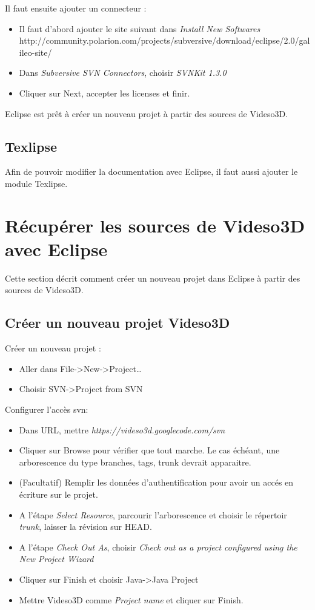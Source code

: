 \documentclass[a4paper, titlepage]{article}
\begin{document}
\vspace{\baselineskip}

Il faut ensuite ajouter un connecteur :
\begin{itemize}
  \item Il faut d'abord ajouter le site suivant dans \emph{Install New
  Softwares} http://community.polarion.com/projects/subversive/download/eclipse/2.0/galileo-site/
  \item Dans \emph{Subversive SVN Connectors}, choisir \emph{SVNKit 1.3.0}
  \item Cliquer sur Next, accepter les licenses et finir.
\end{itemize}

\vspace{\baselineskip}
Eclipse est prêt à créer un nouveau projet à partir des sources de Videso3D.

\subsection{Texlipse}
Afin de pouvoir modifier la documentation avec Eclipse, il faut aussi ajouter
le module Texlipse.


\section{Récupérer les sources de Videso3D avec Eclipse}
Cette section décrit comment créer un nouveau projet dans Eclipse à partir des
sources de Videso3D.

\subsection{Créer un nouveau projet Videso3D}

Créer un nouveau projet :
\begin{itemize}
  \item Aller dans File->New->Project\ldots
  \item Choisir SVN->Project from SVN
\end{itemize}

\vspace{\baselineskip}
Configurer l'accès svn:
\begin{itemize}
  \item Dans URL, mettre \emph{https://videso3d.googlecode.com/svn}
  \item Cliquer sur Browse pour vérifier que tout marche. Le cas échéant, une
  arborescence du type branches, tags, trunk devrait apparaitre.
  \item (Facultatif) Remplir les données d'authentification pour avoir un
  accés en écriture sur le projet.
  \item A l'étape \emph{Select Resource}, parcourir l'arborescence et choisir
  le répertoir \emph{trunk}, laisser la révision sur HEAD.
  \item A l'étape \emph{Check Out As}, choisir \emph{Check out as a project
  configured using the New Project Wizard}
  \item Cliquer sur Finish et choisir Java->Java Project
  \item Mettre Videso3D comme \emph{Project name} et cliquer sur Finish.
\end{itemize}
\end{document}

